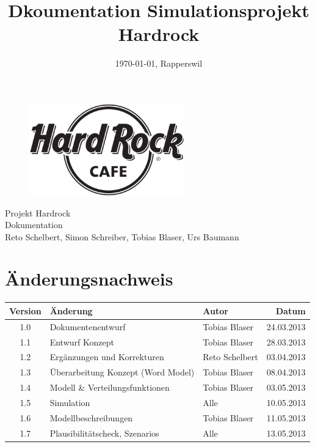 \documentclass[ngerman,a4paper,12pt]{scrreprt}
\title{Dkoumentation Simulationsprojekt Hardrock}
\date{\today{}, Rapperswil}
\def\author{Reto Schelbert, Simon Schreiber, Tobias Blaser, Urs Baumann}
\begin{document}
\thispagestyle{empty}
\begin{titlepage}
	\begin{center}

	\vspace*{40mm}
	
	\begin{figure}[htp]
		\centering
		\includegraphics[width=0.60\textwidth]{img/Hard-Rock-Cafe-Logo-Black-White.png}
	\end{figure}		
	\vspace*{20mm}
	
	{\fontsize{40}{48} \selectfont Projekt Hardrock \\[10mm]}
	{\fontsize{32}{48} \selectfont Dokumentation \\[5mm]}	
	\vspace*{20mm}
	\author

\end{center}
\end{titlepage}
\clearpage

\chapter*{Änderungsnachweis}
\begin{tabularx}{\textwidth}{|cXlr|} %
		\hline
		\textbf{Version} & \textbf{Änderung} & \textbf{Autor} & \textbf{Datum}\\
		\hline
		1.0 & Dokumentenentwurf & Tobias Blaser & 24.03.2013 \\
		1.1 & Entwurf Konzept & Tobias Blaser & 28.03.2013 \\
		1.2 & Ergänzungen und Korrekturen & Reto Schelbert & 03.04.2013 \\
		1.3 & Überarbeitung Konzept (Word Model) & Tobias Blaser & 08.04.2013 \\
		1.4 & Modell \& Verteilungsfunktionen & Tobias Blaser & 03.05.2013 \\
		1.5 & Simulation & Alle & 10.05.2013 \\
		1.6 & Modellbeschreibungen & Tobias Blaser & 11.05.2013\\
		1.7 & Plausibilitätscheck, Szenarios & Alle & 13.05.2013\\
		\hline
\end{tabularx}
\end{document}
